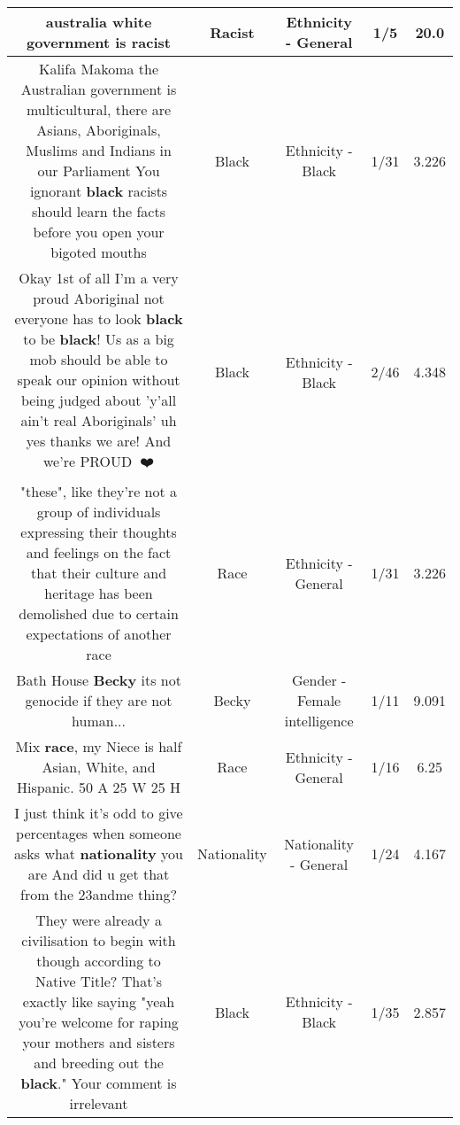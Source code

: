 \documentclass[11pt]{article}
\newlength\mylength
\begin{document}
\begin{center}
\begin{longtable}{|C{.65\mylength}|C{.30\mylength}|C{.12\mylength}|C{.12\mylength}|C{.12\mylength}|}
  \small australia white government is racist\normalsize   & Racist & Ethnicity - General & 1/5 & 20.0 \\  \hline
  \small Kalifa Makoma the Australian government is multicultural, there are Asians, Aboriginals, Muslims and Indians in our Parliament You ignorant \textbf{black} racists should learn the facts before you open your bigoted mouths\normalsize   & Black & Ethnicity - Black & 1/31 & 3.226 \\  \hline
  \small Okay 1st of all I'm a very proud Aboriginal not everyone has to look \textbf{black} to be \textbf{black}! Us as a big mob should be able to speak our opinion without being judged about 'y'all ain't real Aboriginals' uh yes thanks we are! And we're PROUD🖤💛❤️\normalsize   & Black & Ethnicity - Black & 2/46 & 4.348 \\  \hline
  \small "these", like they're not a group of individuals expressing their thoughts and feelings on the fact that their culture and heritage has been demolished due to certain expectations of another race\normalsize   & Race & Ethnicity - General & 1/31 & 3.226 \\  \hline
  \small Bath House \textbf{Becky} its not genocide if they are not human...\normalsize   & Becky & Gender - Female intelligence & 1/11 & 9.091 \\  \hline
  \small Mix \textbf{race}, my Niece is half Asian, White, and Hispanic. 50 A 25 W 25 H\normalsize   & Race & Ethnicity - General & 1/16 & 6.25 \\  \hline
  \small I just think it's odd to give percentages when someone asks what \textbf{nationality} you are And did u get that from the 23andme thing?\normalsize   & Nationality & Nationality - General & 1/24 & 4.167 \\  \hline
  \small They were already a civilisation to begin with though according to Native Title? That's exactly like saying "yeah you're welcome for raping your mothers and sisters and breeding out the \textbf{black}." Your comment is irrelevant\normalsize   & Black & Ethnicity - Black & 1/35 & 2.857 \\  \hline

\end{longtable}
\end{center}
\end{document}
